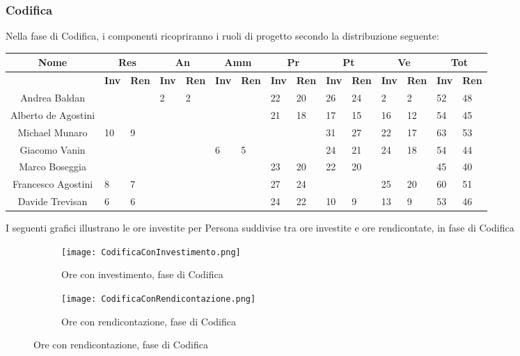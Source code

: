 \documentclass{scalatekids-article}
\begin{document}
\subsubsection{Codifica}
Nella fase di Codifica, i componenti ricopriranno i ruoli di progetto secondo la distribuzione seguente:
\begin{center}
  \scriptsize
  \begin{tabular}{| c | p{0.35cm}  p{0.35cm} | p{0.35cm}  p{0.35cm} | p{0.35cm}  p{0.35cm} | p{0.35cm}  p{0.35cm} | p{0.35cm}  p{0.35cm} | p{0.35cm}  p{0.35cm} | p{0.35cm}  p{0.35cm} |}
    \hline
    \textbf{Nome} & \multicolumn{2}{|c|}{\textbf{Res}} & \multicolumn{2}{|c|}{\textbf{An}} & \multicolumn{2}{|c|}{\textbf{Amm}} & \multicolumn{2}{|c|}{\textbf{Pr}} & \multicolumn{2}{|c|}{\textbf{Pt}} & \multicolumn{2}{|c|}{\textbf{Ve}} & \multicolumn{2}{|c|}{\textbf{Tot}}\\
    \hline
    & \textbf{Inv} & \textbf{Ren} & \textbf{Inv} & \textbf{Ren} & \textbf{Inv} & \textbf{Ren} & \textbf{Inv} & \textbf{Ren} & \textbf{Inv} & \textbf{Ren} & \textbf{Inv} & \textbf{Ren} & \textbf{Inv} & \textbf{Ren}\\
    \hline
    Andrea Baldan & & & 2 & 2 & & & 22 & 20 & 26 & 24 & 2 & 2 & 52 & 48\\
    Alberto de Agostini & & & & & & & 21 & 18 & 17 & 15 & 16 & 12 & 54 & 45\\
    Michael Munaro & 10 & 9 & & & & & & & 31 & 27 & 22 & 17 & 63 & 53\\
    Giacomo Vanin & & & & & 6 & 5 & & & 24 & 21 & 24 & 18 & 54 & 44\\
    Marco Boseggia & & & & & & & 23 & 20 & 22 & 20 & & & 45 & 40\\
    Francesco Agostini & 8 & 7 & & & & & 27 & 24 & & & 25 & 20 & 60 & 51\\
    Davide Trevisan & 6 & 6 & & & & & 24 & 22 & 10 & 9 & 13 & 9 & 53 & 46\\
    \hline
  \end{tabular}
\end{center}
\normalsize
I seguenti grafici illustrano le ore investite per Persona suddivise tra ore investite e ore rendicontate, in fase di Codifica
\begin{figure}[H]
  \begin{subfigure}[H]{0.47\textwidth}
    \texttt{[image: CodificaConInvestimento.png]}
    \caption{Ore con investimento, fase di Codifica}
  \end{subfigure}
  \qquad
  \begin{subfigure}[H]{0.47\textwidth}
    \texttt{[image: CodificaConRendicontazione.png]}
    \caption{Ore con rendicontazione, fase di Codifica}
  \end{subfigure}
\end{figure}
\newpage
\end{document}
